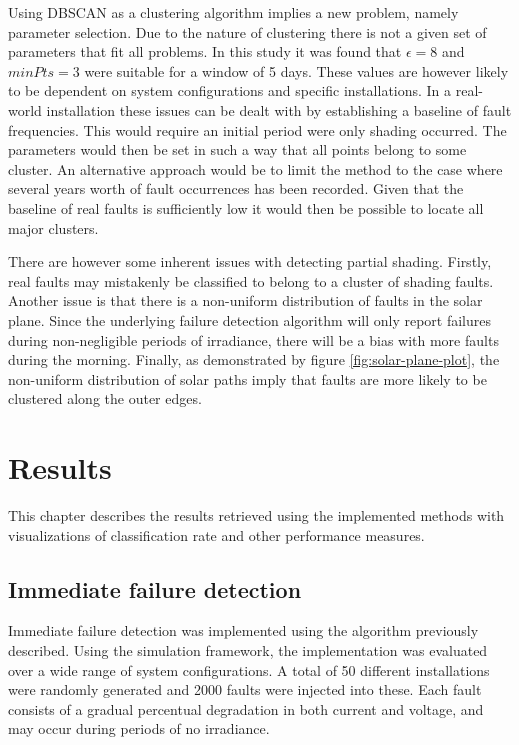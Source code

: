 Using DBSCAN as a clustering algorithm implies a new problem, namely parameter selection.
Due to the nature of clustering there is not a given set of parameters that fit all problems.
In this study it was found that $\epsilon = 8$ and $minPts = 3$ were suitable for a window of 5 days.
These values are however likely to be dependent on system configurations and specific installations.
In a real-world installation these issues can be dealt with by establishing a baseline of fault frequencies.
This would require an initial period were only shading occurred.
The parameters would then be set in such a way that all points belong to some cluster.
An alternative approach would be to limit the method to the case where several years worth of fault occurrences has been recorded.
Given that the baseline of real faults is sufficiently low it would then be possible to locate all major clusters.

There are however some inherent issues with detecting partial shading.
Firstly, real faults may mistakenly be classified to belong to a cluster of shading faults.
Another issue is that there is a non-uniform distribution of faults in the solar plane.
Since the underlying failure detection algorithm will only report failures during non-negligible periods
of irradiance, there will be a bias with more faults during the morning.
Finally, as demonstrated by figure \ref{fig:solar-plane-plot}, the non-uniform distribution of solar paths imply that 
faults are more likely to be clustered along the outer edges.

\chapter{Results}
This chapter describes the results retrieved using the implemented methods with visualizations of classification rate and other performance measures.

\section{Immediate failure detection}
Immediate failure detection was implemented using the algorithm previously described.
Using the simulation framework, the implementation was evaluated over a wide range of system configurations.
A total of 50 different installations were randomly generated and 2000 faults were injected into these.
Each fault consists of a gradual percentual degradation in both current and voltage, and may occur during periods of no irradiance.

